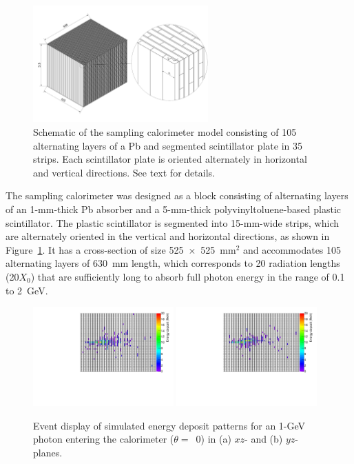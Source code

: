 \documentclass[preprint,12pt,times,a4paper]{elsarticle}
\begin{document}
\begin{figure}[!hbt]
\centering
\includegraphics[width=0.6\textwidth]{figures/Fig1_detector_schematic.jpeg}
\caption{ Schematic of the sampling calorimeter model consisting of 105 alternating layers of a Pb and segmented scintillator plate in 35 strips. Each scintillator plate is oriented alternately in horizontal and vertical directions. See text for details. }
\label{fig:det_conf}
\end{figure}


The sampling calorimeter was designed as a block consisting of alternating layers of an 1-mm-thick Pb absorber and a 5-mm-thick polyvinyltoluene-based plastic scintillator. The plastic scintillator is segmented into 15-mm-wide strips, which are alternately oriented in the vertical and horizontal directions, as shown in Figure~\ref{fig:det_conf}. It has a cross-section of size 525~$\times$~525~mm$^{2}$ and accommodates 105 alternating layers of 630~mm length, which corresponds to 20 radiation lengths (20$X_{0}$) that are sufficiently long to absorb full photon energy in the range of 0.1 to 2~GeV.

\begin{figure}[!hbt]
\centering
\includegraphics[width=0.48\textwidth]{figures/Fig2_EMShower_XZ.pdf}
\includegraphics[width=0.48\textwidth]{figures/Fig2_EMShower_YZ.pdf}
\caption{ Event display of simulated energy deposit patterns for an 1-GeV photon entering the calorimeter ($\theta=$~0) in (a) $xz$- and (b) $yz$-planes.}
\label{fig:Evt_Dis}
\end{figure}
\end{document}
